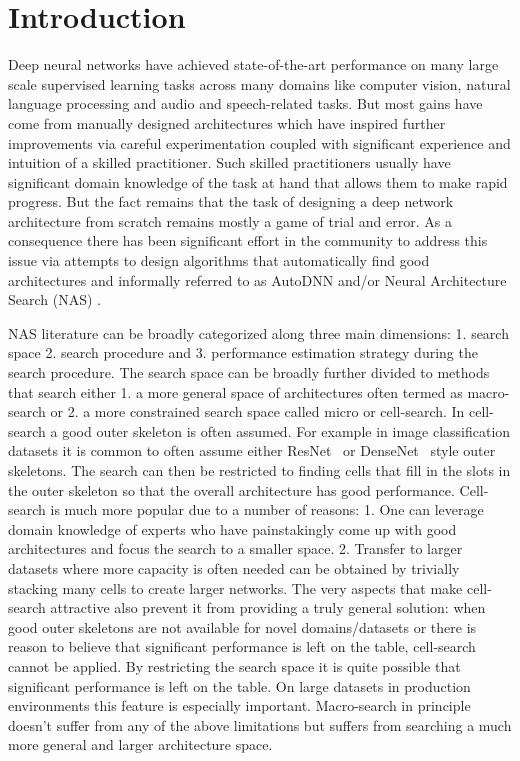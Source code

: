 \section{Introduction}
\label{sec:nas_introduction}

Deep neural networks have achieved state-of-the-art performance on many large scale supervised learning tasks across many domains like computer vision, natural language processing and audio and speech-related tasks. But most gains have come from manually designed architectures which have inspired further improvements via careful experimentation coupled with significant experience and intuition of a skilled practitioner. Such skilled practitioners usually have significant domain knowledge of the task at hand that allows them to make rapid progress. But the fact remains that the task of designing a deep network architecture from scratch remains mostly a game of trial and error. As a consequence there has been significant effort in the community to address this issue via attempts to design algorithms that automatically find good architectures and informally referred to as AutoDNN and/or Neural Architecture Search (NAS) \cite{nas}. 

NAS literature can be broadly categorized along three main dimensions: 1. search space 2. search procedure and 3. performance estimation strategy during the search procedure. The search space can be broadly further divided to methods that search either 1. a more general space of architectures often termed as macro-search or 2. a more constrained search space called micro or cell-search. In cell-search a good outer skeleton is often assumed. For example in image classification datasets it is common to often assume either ResNet~\citep{resnet} or DenseNet~\cite{densenet} style outer skeletons. The search can then be restricted to finding cells that fill in the slots in the outer skeleton so that the overall architecture has good performance. Cell-search is much more popular due to a number of reasons: 1. One can leverage domain knowledge of experts who have painstakingly come up with good architectures and focus the search to a smaller space. 2. Transfer to larger datasets where more capacity is often needed can be obtained by trivially stacking many cells to create larger networks. The very aspects that make cell-search attractive also prevent it from providing a truly general solution: when good outer skeletons are not available for novel domains/datasets or there is reason to believe that significant performance is left on the table, cell-search cannot be applied. By restricting the search space it is quite possible that significant performance is left on the table. On large datasets in production environments this feature is especially important. Macro-search in principle doesn't suffer from any of the above limitations but suffers from searching a much more general and larger architecture space. 

